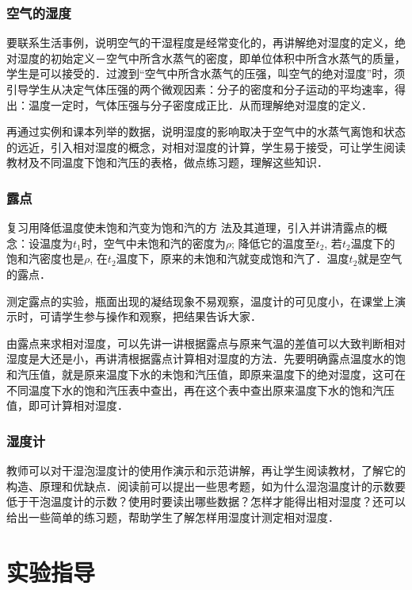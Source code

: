 \subsubsection{空气的湿度}

要联系生活事例，说明空气的干湿程度是经常变化的，再讲解绝对湿度的定义，绝对湿度的初始定义－空气中所含水蒸气的密度，即单位体积中所含水蒸气的质量，学生是可以接受的．过渡到“空气中所含水蒸气的压强，叫空气的绝对湿度”时，须引导学生从决定气体压强的两个微观因素：分子的密度和分子运动的平均速率，得出：温度一定时，气体压强与分子密度成正比．从而理解绝对湿度的定义．

再通过实例和课本列举的数据，说明湿度的影响取决于空气中的水蒸气离饱和状态的远近，引入相对湿度的概念，对相对湿度的计算，学生易于接受，可让学生阅读教材及不同温度下饱和汽压的表格，做点练习题，理解这些知识．

\subsubsection{露点}

复习用降低温度使未饱和汽变为饱和汽的方
法及其道理，引入并讲清露点的概念：设温度为$t_1$时，空气中未饱和汽的密度为$\rho$; 降低它的温度至$t_2$, 若$t_2$温度下的饱和汽密度也是$\rho$, 在$t_2$温度下，原来的未饱和汽就变成饱和汽了．温度$t_2$就是空气的露点．

测定露点的实验，瓶面出现的凝结现象不易观察，温度计的可见度小，在课堂上演示时，可请学生参与操作和观察，把结果告诉大家．

由露点来求相对湿度，可以先讲一讲根据露点与原来气温的差值可以大致判断相对湿度是大还是小，再讲清根据露点计算相对湿度的方法．先要明确露点温度水的饱和汽压值，就是原来温度下水的未饱和汽压值，即原来温度下的绝对湿度，这可在不同温度下水的饱和汽压表中查出，再在这个表中查出原来温度下水的饱和汽压值，即可计算相对湿度．

\subsubsection{湿度计}

教师可以对干湿泡湿度计的使用作演示和示范讲解，再让学生阅读教材，了解它的构造、原理和优缺点．阅读前可以提出一些思考题，如为什么湿泡温度计的示数要低于干泡温度计的示数？使用时要读出哪些数据？怎样才能得出相对湿度？还可以给出一些简单的练习题，帮助学生了解怎样用湿度计测定相对湿度．

\section{实验指导}
